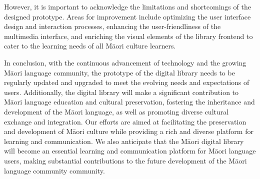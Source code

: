 However, it is important to acknowledge the limitations and shortcomings of the designed prototype. Areas for improvement include optimizing the user interface design and interaction processes, enhancing the user-friendliness of the multimedia interface, and enriching the visual elements of the library frontend to cater to the learning needs of all Māori culture learners.

In conclusion, with the continuous advancement of technology and the growing Māori language community, the prototype of the digital library needs to be regularly updated and upgraded to meet the evolving needs and expectations of users. Additionally, the digital library will make a significant contribution to Māori language education and cultural preservation, fostering the inheritance and development of the Māori language, as well as promoting diverse cultural exchange and integration. Our efforts are aimed at facilitating the preservation and development of Māori culture while providing a rich and diverse platform for learning and communication. We also anticipate that the Māori digital library will become an essential learning and communication platform for Māori language users, making substantial contributions to the future development of the Māori language community community\cite{MaoriCul16:online}.

